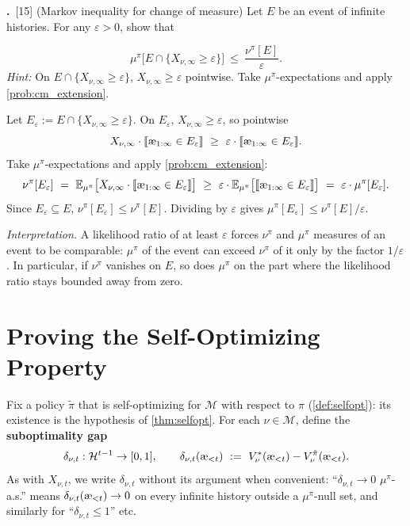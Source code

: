 \documentclass[fontsize=11pt, parskip=half]{scrartcl}
\theoremstyle{definition}
\newenvironment{solution}{%
    \begin{tcolorbox}[colback=black!5!white, colframe=black!50!white,
      title={\textbf{Solution}}, fonttitle=\normalfont, breakable]
  }{\end{tcolorbox}}
\newenvironment{solution}{\expandafter\comment}{\expandafter\endcomment}
\newcommand{\mysubsection}[2]{\par\medskip\noindent\refstepcounter{subsection}\textbf{\thesubsection.}~#2\par\smallskip}
\newcommand{\cH}{\mathcal{H}}
\newcommand{\cM}{\mathcal{M}}
\newcommand{\Ex}{\mathbb{E}}
\newcommand{\aes}{\textnormal{\ae}}
\begin{document}
\mysubsection{3}{[15] (Markov inequality for change of measure) Let $E$ be an event of infinite histories. For any $\varepsilon > 0$, show that
\label{prob:markov_cm}}
\[
    \mu^\pi\big[E \cap \{X_{\nu,\infty} \geq \varepsilon\}\big] ~\leq~ \frac{\nu^\pi[E]}{\varepsilon}.
\]
\textit{Hint:} On $E \cap \{X_{\nu,\infty} \geq \varepsilon\}$, $X_{\nu,\infty} \geq \varepsilon$ pointwise. Take $\mu^\pi$-expectations and apply \cref{prob:cm_extension}.

\begin{solution}
Let $E_\varepsilon := E \cap \{X_{\nu,\infty} \geq \varepsilon\}$. On $E_\varepsilon$, $X_{\nu,\infty} \geq \varepsilon$, so pointwise
\[
    X_{\nu,\infty} \cdot \llbracket \aes_{1:\infty} \in E_\varepsilon \rrbracket
    ~\geq~ \varepsilon \cdot \llbracket \aes_{1:\infty} \in E_\varepsilon \rrbracket.
\]
Take $\mu^\pi$-expectations and apply \cref{prob:cm_extension}:
\[
    \nu^\pi[E_\varepsilon]
    ~=~ \Ex_{\mu^\pi}\big[X_{\nu,\infty} \cdot \llbracket \aes_{1:\infty} \in E_\varepsilon \rrbracket\big]
    ~\geq~ \varepsilon \cdot \Ex_{\mu^\pi}\big[\llbracket \aes_{1:\infty} \in E_\varepsilon \rrbracket\big]
    ~=~ \varepsilon \cdot \mu^\pi[E_\varepsilon].
\]
Since $E_\varepsilon \subseteq E$, $\nu^\pi[E_\varepsilon] \leq \nu^\pi[E]$. Dividing by $\varepsilon$ gives $\mu^\pi[E_\varepsilon] \leq \nu^\pi[E]/\varepsilon$.

\emph{Interpretation.} A likelihood ratio of at least $\varepsilon$ forces $\nu^\pi$ and $\mu^\pi$ measures of an event to be comparable: $\mu^\pi$ of the event can exceed $\nu^\pi$ of it only by the factor $1/\varepsilon$. In particular, if $\nu^\pi$ vanishes on $E$, so does $\mu^\pi$ on the part where the likelihood ratio stays bounded away from zero.
\end{solution}


\section{Proving the Self-Optimizing Property}\label{prob:selfopt}

Fix a policy $\tilde\pi$ that is self-optimizing for $\cM$ with respect to $\pi$ (\cref{def:selfopt}): its existence is the hypothesis of \cref{thm:selfopt}.
For each $\nu \in \cM$, define the \textbf{suboptimality gap}
\[
    \delta_{\nu,t} : \cH^{t-1} \to [0,1], \qquad \delta_{\nu,t}(\aes_{<t}) ~:=~ V_\nu^*(\aes_{<t}) - V_\nu^{\tilde\pi}(\aes_{<t}).
\]
As with $X_{\nu,t}$, we write $\delta_{\nu,t}$ without its argument when convenient: ``$\delta_{\nu,t} \to 0$ $\mu^\pi$-a.s.'' means $\delta_{\nu,t}(\aes_{<t}) \to 0$ on every infinite history outside a $\mu^\pi$-null set, and similarly for ``$\delta_{\nu,t} \leq 1$'' etc.
\end{document}
